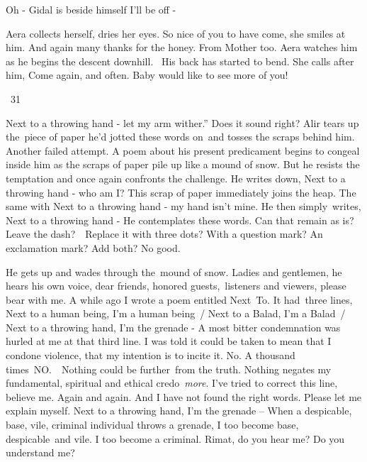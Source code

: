 \documentclass[twoside,11pt]{book}
\begin{document}
{\textquotedbl}Oh -{\textquotedbl} Gidal is beside himself {\textquotedbl}I'll be off -{\textquotedbl}

Aera collects herself, dries her eyes. {\textquotedbl}So nice of you to have come,{\textquotedbl} she smiles at him.
{\textquotedbl}And again many thanks for the honey. From Mother too.{\textquotedbl} Aera watches him as he begins the
descent downhill. \ His back has started to bend. She calls after him, {\textquotedbl}Come again, and often. Baby would
like to see more of you!{\textquotedbl}


\bigskip

~31 

{\textquotedbl}Next to a throwing hand - let my arm wither.'' Does it sound right? Alir tears up the~piece of paper he'd
jotted these words on{\ }and tosses the scraps behind him. Another failed
attempt.  A poem about his present predicament begins to congeal inside him as the scraps of paper pile up like a mound
of snow. But he resists the temptation and once again confronts the challenge. He writes down, {\textquotedbl}Next to a
throwing hand - who am I?{\textquotedbl} This scrap of paper immediately joins the heap. The same with
{\textquotedbl}Next to a throwing hand - my hand isn't mine.{\textquotedbl} He then
simply{\ }writes, {\textquotedbl}Next to a throwing hand -{\textquotedbl} He
contemplates these words. Can that remain as is? Leave the dash?\ \ Replace it with three dots? With a question mark?
An exclamation mark? Add both? No good. 

He gets up and wades through the\ mound of snow. {\textquotedbl}Ladies and gentlemen,{\textquotedbl} he hears his own
voice, {\textquotedbl}dear friends, honored guests,~listeners and viewers, please bear with me. A while ago I wrote a
poem entitled {\textquotedbl}Next\ To{\textquotedbl}. It had~three lines, {\textquotedbl}Next to a human being, I'm a
human being~/ Next to a Balad, I'm a Balad~/ Next to a throwing hand, I'm the grenade -{\textquotedbl} A most bitter
condemnation was hurled at me at that  third line. I was told it could be taken to mean that I condone violence, that
my intention is to incite it. No. A thousand times~NO.\ \ Nothing could be further~from the truth. Nothing negates my
fundamental, spiritual and ethical credo\ \textit{more}. I've tried to correct this line, believe me. Again and again.
And I have not found the right words. Please let me explain myself. {\textquotedbl}Next to a throwing hand, I'm the
grenade --{\textquotedbl} When a despicable, base, vile, criminal individual throws a grenade, I too become base,
despicable{\ }and vile. I too become a criminal. Rimat, do you hear me? Do you
understand me?
\end{document}

